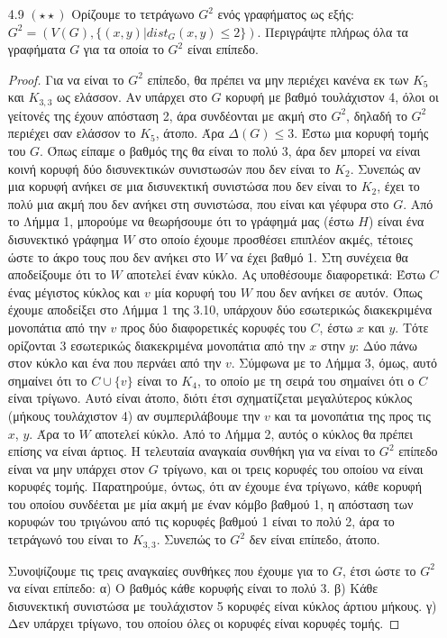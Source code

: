 \documentclass[a4paper, oneside, 11pt]{article}
\theoremstyle{definition}
\begin{document}
\begin{enumerate}
\item[4.9 $(\star\star)$]
	Ορίζουμε το τετράγωνο $G^2$ ενός γραφήματος ως εξής: $G^2 = (V(G), \{(x,y) | dist_G (x,y) \leq 2\})$. Περιγράψτε πλήρως όλα τα γραφήματα $G$ για τα οποία το $G^2$ είναι επίπεδο.
	\begin{proof}
Για να είναι το $G^2$ επίπεδο, θα πρέπει να μην περιέχει κανένα εκ των $K_5$ και $K_{3,3}$ ως ελάσσον. Αν υπάρχει στο $G$ κορυφή με βαθμό τουλάχιστον 4, όλοι οι γείτονές της έχουν απόσταση 2, άρα συνδέονται
με ακμή στο $G^2$, δηλαδή το $G^2$ περιέχει σαν ελάσσον το $K_5$, άτοπο. Άρα $\Delta (G)\leq 3$. Έστω μια κορυφή τομής του $G$. Όπως είπαμε ο βαθμός της θα είναι το πολύ 3, άρα δεν μπορεί να είναι κοινή
κορυφή δύο δισυνεκτικών συνιστωσών που δεν είναι το $K_2$.
 Συνεπώς αν μια κορυφή ανήκει σε μια δισυνεκτική συνιστώσα που δεν είναι το $K_2$, έχει το πολύ μια ακμή που δεν ανήκει στη συνιστώσα, που είναι και γέφυρα στο $G$. Από το Λήμμα 1,
μπορούμε να θεωρήσουμε ότι το γράφημά μας (έστω $H$) είναι ένα δισυνεκτικό γράφημα $W$ στο οποίο έχουμε προσθέσει επιπλέον ακμές, τέτοιες ώστε το άκρο τους που δεν ανήκει στο $W$ να έχει βαθμό 1.
Στη συνέχεια θα αποδείξουμε ότι το $W$ αποτελεί έναν κύκλο. Ας υποθέσουμε διαφορετικά: Έστω $C$ ένας μέγιστος κύκλος και $v$ μία κορυφή του $W$ που δεν ανήκει σε αυτόν. Όπως έχουμε αποδείξει στο Λήμμα 1
της 3.10, υπάρχουν δύο εσωτερικώς διακεκριμένα μονοπάτια από την $v$ προς δύο διαφορετικές κορυφές του $C$, έστω $x$ και $y$. Τότε ορίζονται 3 εσωτερικώς διακεκριμένα μονοπάτια από την $x$ στην $y$: Δύο
πάνω στον κύκλο και ένα που περνάει από την $v$. Σύμφωνα με το Λήμμα 3, όμως, αυτό σημαίνει ότι το $C\cup \{v\}$ είναι το $K_4$, το οποίο με τη σειρά του σημαίνει ότι ο $C$ είναι τρίγωνο. Αυτό είναι άτοπο,
διότι έτσι σχηματίζεται μεγαλύτερος κύκλος (μήκους τουλάχιστον 4) αν συμπεριλάβουμε την $v$ και τα μονοπάτια της προς τις $x$, $y$. Άρα το $W$ αποτελεί κύκλο. Από το Λήμμα 2, αυτός ο κύκλος θα πρέπει επίσης
να είναι άρτιος. Η τελευταία αναγκαία συνθήκη για να είναι το $G^2$ επίπεδο είναι να μην υπάρχει στον $G$ τρίγωνο, και οι τρεις κορυφές του οποίου να είναι κορυφές τομής. Παρατηρούμε, όντως, ότι αν έχουμε
ένα τρίγωνο, κάθε κορυφή του οποίου συνδέεται με μία ακμή με έναν κόμβο βαθμού 1, η απόσταση των κορυφών του τριγώνου από τις κορυφές βαθμού 1 είναι το πολύ 2, άρα το τετράγωνό του είναι το $K_{3,3}$.
Συνεπώς το $G^2$ δεν είναι επίπεδο, άτοπο.

\newline\newline
Συνοψίζουμε τις τρεις αναγκαίες συνθήκες που έχουμε για το $G$, έτσι ώστε το $G^2$ να είναι επίπεδο:
α) Ο βαθμός κάθε κορυφής είναι το πολύ 3.
β) Κάθε δισυνεκτική συνιστώσα με τουλάχιστον 5 κορυφές είναι κύκλος άρτιου μήκους.
γ) Δεν υπάρχει τρίγωνο, του οποίου όλες οι κορυφές είναι κορυφές τομής.


\end{proof}
\end{enumerate}
\end{document}
